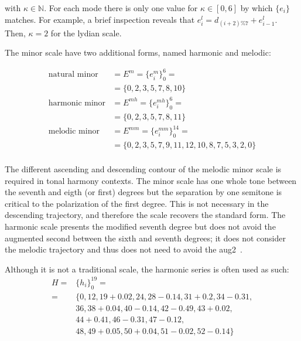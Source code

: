 \noindent with $\kappa \in \mathbb{N}$. For each mode there is only one value for $\kappa \in [0,6]$ by which $\{e_i\}$ matches. 
For example, a brief inspection reveals that
$e_i^{l}=d_{(i+2)\%7}+e_{i-1}^{l}$. Then, $\kappa=2$ for the lydian scale.

The minor scale have two additional forms, named harmonic and melodic:

\begin{equation}\label{eq:escalasMenores}
\begin{split}
\text{natural minor}&  = E^m = \{e_i^m\}_0^6 = \\
                                           &  = \{0,2,3,5,7,8,10\} \\
\text{harmonic minor}                      &  = E^{mh} = \{e_i^{mh}\}_0^6 = \\
                                           &  = \{0,2,3,5,7,8,11\} \\
\text{melodic minor}                       &  = E^{mm} = \{e_i^{mm}\}_0^{14} = \\
                                           &  = \{0,2,3,5,7,9,11,12,10,8,7,5,3,2,0\} \\
\end{split}
\end{equation}

The different ascending and descending contour of the melodic minor scale is required in tonal harmony contexts.
The minor scale has one whole tone between the seventh and eigth (or first) degrees but
the separation by one semitone is critical to the polarization of the first degree.
This is not necessary in the descending trajectory, and therefore the scale recovers the standard form.
The harmonic scale presents the modified seventh degree but does not avoid the augmented second between the sixth and seventh degrees; it does not consider the melodic trajectory and thus does not need to avoid the aug2~\cite{Harmonia}.

Although it is not a traditional scale, the harmonic series is often used as such:
\begin{equation}\label{eq:serieHarmonica}
\begin{split}
H = & \{h_i\}_0^{19}= \\
    =  & \{ 0,12,19+0.02,  24,28-0.14, 31+0.2, 34-0.31, \\
                     & 36, 38+0.04,40-0.14, 42-0.49, 43+0.02, \\
                     & 44+0.41, 46-0.31, 47-0.12, \\
                     & 48, 49+0.05, 50+0.04, 51-0.02, 52-0.14   \}
\end{split}
\end{equation}

